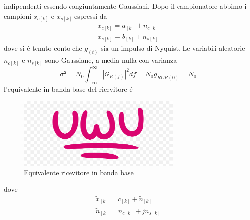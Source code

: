             indipendenti essendo congiuntamente Gaussiani. Dopo il campionatore abbimo i campioni $x_{c[k]}$ e $x_{s[k]}$ espressi da 
            \begin{gather}
                x_{c[k]} = a_[k]+n_{c[k]}\nonumber \\
                x_{s[k]} = b_[k]+n_{s[k]}\nonumber
            \end{gather}
            dove si é tenuto conto che $g_{(t)}$ sia un impulso di Nyquist. Le variabili aleatorie $n_{c[k]}$ e $n_{s[k]}$ sono 
            Gaussiane, a media nulla con varianza 
            \[
                \sigma^2 = N_0\int_{-\infty}^{\infty}\left|G_{R(f)}\right|^2df= N_0g_{RCR(0)} = N_0
            \]
            l'equivalente in banda base del ricevitore é 
            \begin{figure}[H]
                \centering
                \includegraphics*[width = 8cm]{media/uwu.png}
                \caption{Equivalente ricevitore in banda base}
            \end{figure}
            dove
            \begin{gather}
                \tilde{x}_{[k]} = c_{[k]}+\tilde{n}_{[k]} \nonumber \\
                \tilde{n}_{[k]} = n_{c[k]}+jn_{s[k]} \nonumber 
            \end{gather}
